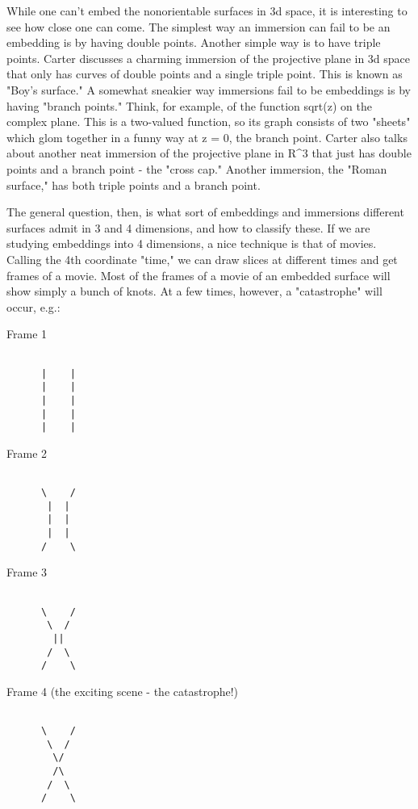 While one can't embed the nonorientable surfaces in 3d space, it is
interesting to see how close one can come.  The simplest way an
immersion can fail to be an embedding is by having double points.  
Another simple way is to have triple points.  Carter discusses a
charming immersion of the projective plane in 3d space that only has
curves of double points and a single triple point.  This is known as
"Boy's surface."  A somewhat sneakier way immersions fail to be
embeddings is by having "branch points."  Think, for example, of the
function sqrt(z) on the complex plane.  This is a two-valued function,
so its graph consists of two "sheets" which glom together in a funny
way at z = 0, the branch point.  Carter also talks about another neat
immersion of the projective plane in R^3 that just has double points and
a branch point - the "cross cap."  Another immersion, the "Roman
surface," has both triple points and a branch point.  

The general question, then, is what sort of embeddings and immersions
different surfaces admit in 3 and 4 dimensions, and how to classify
these.  If we are studying embeddings into 4 dimensions, a nice
technique is that of movies.  Calling the 4th coordinate "time," we can
draw slices at different times and get frames of a movie.  Most of the
frames of a movie of an embedded surface will show simply a bunch of
knots.  At a few times, however, a "catastrophe" will occur, e.g.:

Frame 1


\begin{verbatim}

      |    |
      |    |
      |    |
      |    |
      |    |
\end{verbatim}
    

Frame 2 


\begin{verbatim}

      \    /
       |  |
       |  |
       |  |
      /    \
\end{verbatim}
    

Frame 3


\begin{verbatim}

      \    /
       \  /
        ||
       /  \
      /    \
\end{verbatim}
    

Frame 4 (the exciting scene - the catastrophe!)


\begin{verbatim}

      \    /
       \  /
        \/
        /\
       /  \
      /    \
\end{verbatim}
    

